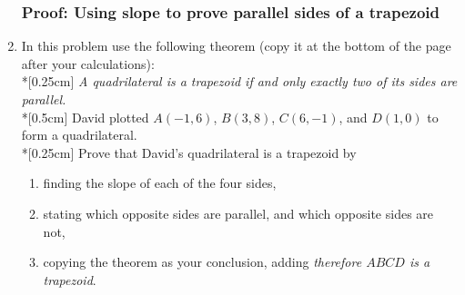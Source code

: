 \documentclass[12pt, twoside]{article}
\begin{document}
\begin{enumerate}
  \subsubsection*{Proof: Using slope to prove parallel sides of a trapezoid}
\item In this problem use the following theorem (copy it at the bottom of the page after your calculations): \\*[0.25cm]
  \emph{A quadrilateral is a trapezoid if and only exactly two of its sides are parallel.}\\*[0.5cm]
  David plotted $A(-1,6)$, $B(3,8)$, $C(6,-1)$, and $D(1,0)$ to form a quadrilateral. \\*[0.25cm]
  Prove that David's quadrilateral is a trapezoid by
  \begin{enumerate}
    \item finding the slope of each of the four sides,
    \item stating which opposite sides are parallel, and which opposite sides are not,
    \item copying the theorem as your conclusion, adding \emph{therefore $ABCD$ is a trapezoid}.
  \end{enumerate}
  \begin{flushright} %
  \end{flushright}

\end{enumerate}
\end{document}
